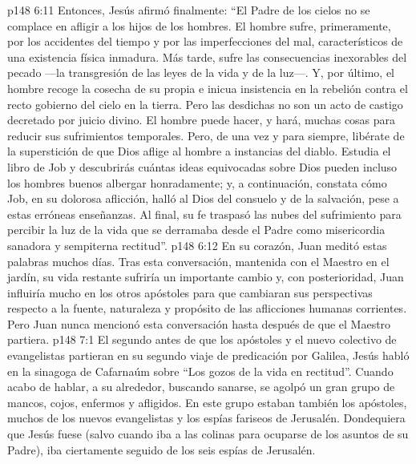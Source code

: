 \vs p148 6:11 Entonces, Jesús afirmó finalmente: “El Padre de los cielos no se complace en afligir a los hijos de los hombres. El hombre sufre, primeramente, por los accidentes del tiempo y por las imperfecciones del mal, característicos de una existencia física inmadura. Más tarde, sufre las consecuencias inexorables del pecado ---la transgresión de las leyes de la vida y de la luz---. Y, por último, el hombre recoge la cosecha de su propia e inicua insistencia en la rebelión contra el recto gobierno del cielo en la tierra. Pero las desdichas no son un acto  de castigo decretado por juicio divino. El hombre puede hacer, y hará, muchas cosas para reducir sus sufrimientos temporales. Pero, de una vez y para siempre, libérate de la superstición de que Dios aflige al hombre a instancias del diablo. Estudia el libro de Job y descubrirás cuántas ideas equivocadas sobre Dios pueden incluso los hombres buenos albergar honradamente; y, a continuación, constata cómo Job, en su dolorosa aflicción, halló al Dios del consuelo y de la salvación, pese a estas erróneas enseñanzas. Al final, su fe traspasó las nubes del sufrimiento para percibir la luz de la vida que se derramaba desde el Padre como misericordia sanadora y sempiterna rectitud”.
\vs p148 6:12 En su corazón, Juan meditó estas palabras muchos días. Tras esta conversación, mantenida con el Maestro en el jardín, su vida restante sufriría un importante cambio y, con posterioridad, Juan influiría mucho en los otros apóstoles para que cambiaran sus perspectivas respecto a la fuente, naturaleza y propósito de las aflicciones humanas corrientes. Pero Juan nunca mencionó esta conversación hasta después de que el Maestro partiera.
\vs p148 7:1 El segundo  antes de que los apóstoles y el nuevo colectivo de evangelistas partieran en su segundo viaje de predicación por Galilea, Jesús habló en la sinagoga de Cafarnaúm sobre “Los gozos de la vida en rectitud”. Cuando acabo de hablar, a su alrededor, buscando sanarse, se agolpó un gran grupo de mancos, cojos, enfermos y afligidos. En este grupo estaban también los apóstoles, muchos de los nuevos evangelistas y los espías fariseos de Jerusalén. Dondequiera que Jesús fuese (salvo cuando iba a las colinas para ocuparse de los asuntos de su Padre), iba ciertamente seguido de los seis espías de Jerusalén.
